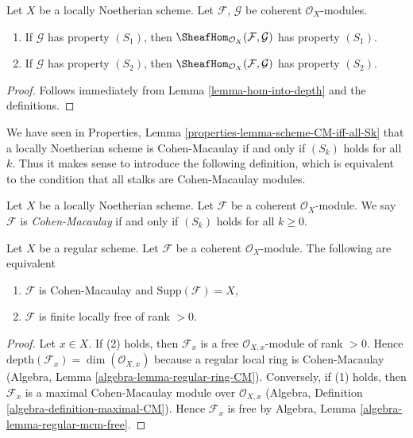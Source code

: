 \begin{lemma}
\label{lemma-hom-into-S2}
Let $X$ be a locally Noetherian scheme. Let $\mathcal{F}$, $\mathcal{G}$
be coherent $\mathcal{O}_X$-modules.
\begin{enumerate}
\item If $\mathcal{G}$ has property $(S_1)$, then
$\SheafHom_{\mathcal{O}_X}(\mathcal{F}, \mathcal{G})$ has property $(S_1)$.
\item If $\mathcal{G}$ has property $(S_2)$, then
$\SheafHom_{\mathcal{O}_X}(\mathcal{F}, \mathcal{G})$ has property $(S_2)$.
\end{enumerate}
\end{lemma}

\begin{proof}
Follows immediately from Lemma \ref{lemma-hom-into-depth}
and the definitions.
\end{proof}

\noindent
We have seen in Properties, Lemma \ref{properties-lemma-scheme-CM-iff-all-Sk}
that a locally Noetherian
scheme is Cohen-Macaulay if and only if $(S_k)$ holds for all $k$.
Thus it makes sense to introduce the following definition, which
is equivalent to the condition that all stalks are Cohen-Macaulay modules.

\begin{definition}
\label{definition-Cohen-Macaulay}
Let $X$ be a locally Noetherian scheme.
Let $\mathcal{F}$ be a coherent $\mathcal{O}_X$-module.
We say $\mathcal{F}$ is {\it Cohen-Macaulay} if and only
if $(S_k)$ holds for all $k \geq 0$.
\end{definition}

\begin{lemma}
\label{lemma-Cohen-Macaulay-over-regular}
Let $X$ be a regular scheme. Let $\mathcal{F}$ be a coherent
$\mathcal{O}_X$-module. The following are equivalent
\begin{enumerate}
\item $\mathcal{F}$ is Cohen-Macaulay and $\text{Supp}(\mathcal{F}) = X$,
\item $\mathcal{F}$ is finite locally free of rank $>0$.
\end{enumerate}
\end{lemma}

\begin{proof}
Let $x \in X$. If (2) holds, then $\mathcal{F}_x$ is a free
$\mathcal{O}_{X, x}$-module of rank $> 0$. Hence
$\text{depth}(\mathcal{F}_x) = \dim(\mathcal{O}_{X, x})$
because a regular local ring is Cohen-Macaulay
(Algebra, Lemma \ref{algebra-lemma-regular-ring-CM}).
Conversely, if (1) holds, then $\mathcal{F}_x$ is a
maximal Cohen-Macaulay module over $\mathcal{O}_{X, x}$
(Algebra, Definition \ref{algebra-definition-maximal-CM}).
Hence $\mathcal{F}_x$ is free by
Algebra, Lemma \ref{algebra-lemma-regular-mcm-free}.
\end{proof}









